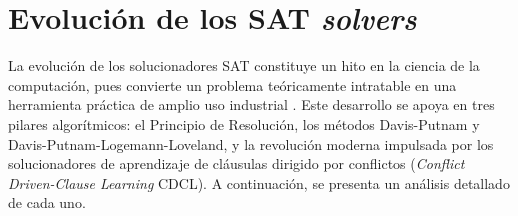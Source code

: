 




\section{Evoluci\'on de los SAT \textit{solvers}}
\label{sec:evolucion-sat-solvers}
La evoluci\'on de los solucionadores SAT constituye un hito en la ciencia de la computaci\'on, pues convierte un problema te\'oricamente intratable en una herramienta pr\'actica de amplio uso industrial \cite{fichte2023silent}. Este desarrollo se apoya en tres pilares algor\'itmicos: el Principio de Resoluci\'on, los m\'etodos Davis-Putnam y Davis-Putnam-Logemann-Loveland, y la revoluci\'on moderna impulsada por los solucionadores de aprendizaje de cl\'ausulas dirigido por conflictos (\textit{Conflict Driven-Clause Learning} CDCL). A continuaci\'on, se presenta un an\'alisis detallado de cada uno.

